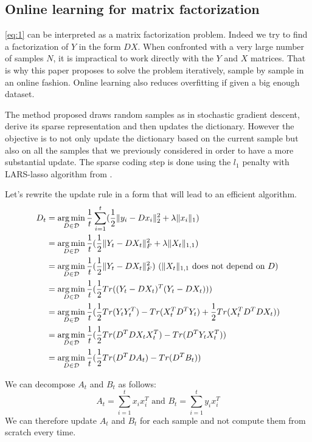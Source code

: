 \documentclass[a4paper,11pt]{article}
\DeclarePairedDelimiter\norm{\lVert}{\rVert} %
\DeclareMathOperator*{\argmin}{arg\,min} %
\begin{document}
\subsection{Online learning for matrix factorization}
\cite{mairal10}
\ref{eq:1} can be interpreted as a matrix factorization problem. Indeed we try to find a factorization of $Y$ in the form $DX$.
When confronted with a very large number of samples $N$, it is impractical to work directly with the $Y$ and $X$ matrices. That is why this paper proposes to solve the problem iteratively, sample by sample in an online fashion. Online learning also reduces overfitting if given a big enough dataset.

The method proposed draws random samples as in stochastic gradient descent, derive its sparse representation and then updates the dictionary.
However the objective is to not only update the dictionary based on the current sample but also on all the samples that we previously considered in order to have a more substantial update.
The sparse coding step is done using the $l_1$ penalty with LARS-lasso algorithm from \cite{efron04}.

Let's rewrite the update rule in a form that will lead to an efficient algorithm.
\begin{equation*}
\begin{split}
  D_t & = \argmin_{D \in \mathcal{D}} \frac{1}{t} \sum\limits_{i=1}^t (\frac{1}{2} \norm{y_i - D x_i}_2^2 + \lambda \norm{x_i}_1)\\
      & = \argmin_{D \in \mathcal{D}} \frac{1}{t}  (\frac{1}{2} \norm{Y_t - DX_t}_F^2 + \lambda \norm{X_t}_{1,1})\\
      & = \argmin_{D \in \mathcal{D}} \frac{1}{t}  (\frac{1}{2} \norm{Y_t - DX_t}_F^2) \text{   ($\norm{X_t}_{1,1}$ does not depend on $D$)}\\
      & = \argmin_{D \in \mathcal{D}} \frac{1}{t}  (\frac{1}{2} Tr((Y_t - DX_t)^T (Y_t - DX_t)))\\
      & = \argmin_{D \in \mathcal{D}} \frac{1}{t}  (\frac{1}{2} Tr(Y_t Y_t^T) - Tr(X_t^T D^T Y_t) + \frac{1}{2} Tr(X_t^T D^T D X_t))\\
      & = \argmin_{D \in \mathcal{D}} \frac{1}{t}  (\frac{1}{2} Tr(D^T D X_t X_t^T) - Tr(D^T Y_t X_t^T) )\\
      & = \argmin_{D \in \mathcal{D}} \frac{1}{t}  (\frac{1}{2} Tr(D^T D A_t) - Tr(D^T B_t) )
\end{split}
\end{equation*}

We can decompose $A_t$ and $B_t$ as follows:
$$ A_t = \sum\limits_{i=1}^t x_i x_i^T \text{ and } B_t = \sum\limits_{i=1}^t y_i x_i^T $$
We can therefore update $A_t$ and $B_t$ for each sample and not compute them from scratch every time.
\end{document}
